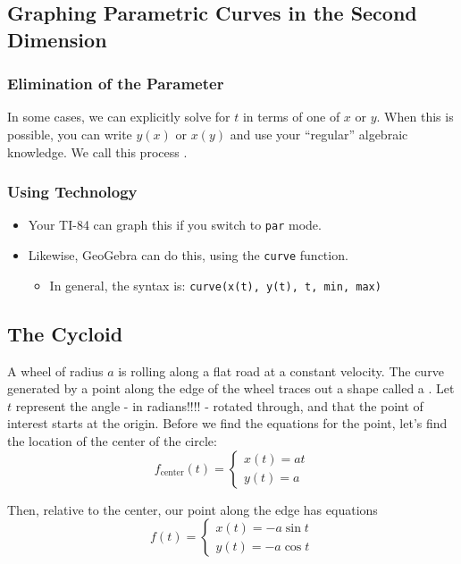\subsection{Graphing Parametric Curves in the Second Dimension}

\subsubsection{Elimination of the Parameter}

In some cases, we can explicitly solve for \(t\) in terms of one of \(x\) or \(y\). When this is possible, you can write \(y(x)\) or \(x(y)\) and use your “regular” algebraic knowledge. We call this process .

\subsubsection{Using Technology}

\begin{itemize}
    \item Your TI-84 can graph this if you switch to \texttt{par} mode.
    \item Likewise, GeoGebra can do this, using the \texttt{curve} function.
          \begin{itemize}
              \item In general, the syntax is: \texttt{curve(x(t), y(t), t, min, max)}
          \end{itemize}
\end{itemize}

\subsection{The Cycloid}
A wheel of radius \(a\) is rolling along a flat road at a constant velocity. The curve generated by a point along the edge of the wheel traces out a shape called a . Let \(t\) represent the angle - in radians!!!! - rotated through, and that the point of interest starts at the origin. Before we find the equations for the point, let's find the location of the center of the circle:
\[
    f_{\text{center}}(t) = \begin{cases}
        x(t) = a t \\
        y(t) = a
    \end{cases}
\]

Then, relative to the center, our point along the edge has equations
\[
    f(t) = \begin{cases}
        x(t) = -a \sin t \\
        y(t) = -a \cos t
    \end{cases}
\]

